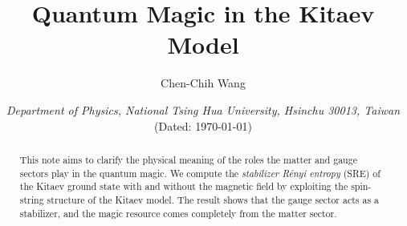 \documentclass[12font]{article}
\title{\textbf{Quantum Magic in the Kitaev Model}}
\author{Chen-Chih Wang  }
\date{\textit{Department of Physics, National Tsing Hua University, Hsinchu 30013, Taiwan} \\ (Dated: \today)}
\numberwithin{equation}{section}    %
\theoremstyle{definition}
\begin{document}
\maketitle
\renewcommand\qedsymbol{$\blacksquare$}



\fontsize{12pt}{16pt}\selectfont

\begin{abstract}
    This note aims to clarify the physical meaning of the roles the matter and gauge sectors play in the quantum magic. We compute the \textit{stabilizer R\'enyi entropy} (SRE) of the Kitaev ground state with and without the magnetic field by exploiting the spin-string structure of the Kitaev model. The result shows that the gauge sector acts as a stabilizer, and the magic resource comes completely from the matter sector.
\end{abstract}

\tableofcontents




\appendix







\end{document}
